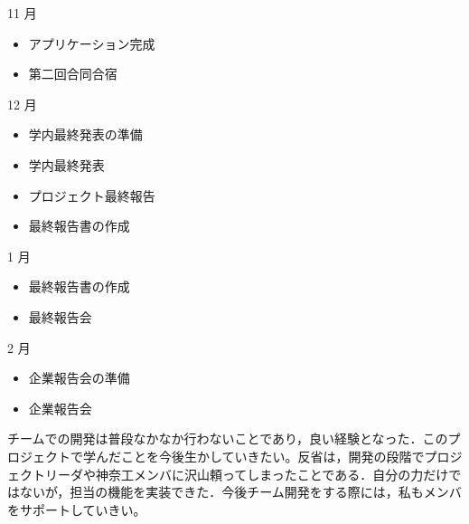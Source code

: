 11 月
\begin{itemize}
\item アプリケーション完成
\item 第二回合同合宿
\end{itemize}
12 月
\begin{itemize}
\item 学内最終発表の準備
\item 学内最終発表
\item プロジェクト最終報告
\item 最終報告書の作成
\end{itemize}
1 月
\begin{itemize}
\item 最終報告書の作成
\item 最終報告会
\end{itemize}
2 月
\begin{itemize}
\item 企業報告会の準備
\item 企業報告会
\end{itemize}
\par チームでの開発は普段なかなか行わないことであり，良い経験となった．このプロジェクトで学んだことを今後生かしていきたい。反省は，開発の段階でプロジェクトリーダや神奈工メンバに沢山頼ってしまったことである．自分の力だけではないが，担当の機能を実装できた．今後チーム開発をする際には，私もメンバをサポートしていきい。
